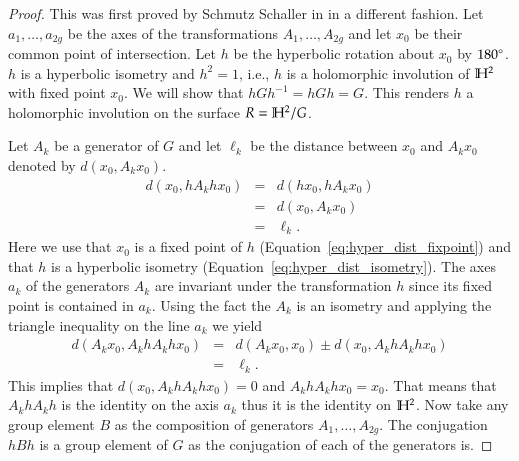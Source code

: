 \documentclass[Thesis]{subfiles}
\begin{document}
\begin{proof}
This was first proved by Schmutz Schaller in \cite{schmutz2000} in a different fashion.
Let $a_1,\ldots,a_{2g}$ be the axes of the transformations $A_1,\ldots,A_{2g}$ and let $x_0$ be their common point of intersection. 
Let $h$ be the hyperbolic rotation about $x_0$ by $180\degree$. $h$ is a hyperbolic isometry and $h^2=1$, i.e., $h$ is a holomorphic involution of $\mathbb H^2$ with fixed point $x_0$. 
We will show that $hGh^{-1}=hGh=G$. 
This renders $h$ a holomorphic involution on the surface $R=\mathbb H^2/G$.

Let $A_k$ be a generator of $G$ and let $\ell_k$ be the distance between $x_0$ and $A_kx_0$ denoted by $d(x_0,A_kx_0)$.
\begin{eqnarray}
d(x_0,hA_khx_0)&=&d(hx_0,hA_kx_0)\label{eq:hyper_dist_fixpoint}\\
&=&d(x_0,A_kx_0)\label{eq:hyper_dist_isometry}\\
&=&\ell_k.
\end{eqnarray}
Here we use that $x_0$ is a fixed point of $h$ (Equation~\ref{eq:hyper_dist_fixpoint}) and that $h$ is a hyperbolic isometry (Equation~\ref{eq:hyper_dist_isometry}). 
The axes $a_k$ of the generators $A_k$ are invariant under the transformation $h$ since its fixed point is contained in $a_k$.
Using the fact the $A_k$ is an isometry and applying the triangle inequality on the line $a_k$ we yield
\begin{eqnarray*}
d(A_kx_0,A_khA_khx_0)&=&d(A_kx_0,x_0)\pm d(x_0,A_khA_khx_0)\\
&=&\ell_k.
\end{eqnarray*}
This implies that $d(x_0,A_khA_khx_0)=0$ and $A_khA_khx_0=x_0$.
That means that $A_khA_kh$ is the identity on the axis $a_k$ thus it is the identity on $\mathbb H^2$. 
Now take any group element $B$ as the composition of generators $A_1,\dots,A_{2g}$. 
The conjugation $hBh$ is a group element of $G$ as the conjugation of each of the generators is.


\end{proof}
\end{document}
